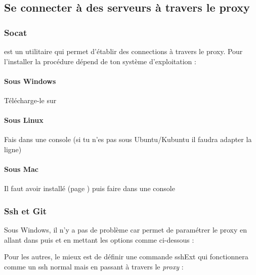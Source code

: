 \subsection{Se connecter à des serveurs à travers le proxy}

\subsubsection{Socat}

 est un utilitaire qui permet d'établir des connections à travers le proxy. Pour l'installer la procédure dépend de ton système d'exploitation :

\paragraph{Sous Windows} Télécharge-le sur 
\paragraph{Sous Linux} Fais  dans une console (si tu n'es pas sous Ubuntu/Kubuntu il faudra adapter la ligne)
\paragraph{Sous Mac} Il faut avoir installé  (page \pageref{mac-fink}) puis faire dans une console

\subsubsection{Ssh et Git}

Sous Windows, il n'y a pas de problème car  permet de paramétrer le proxy en allant dans  puis  et en mettant les options comme ci-dessous :


Pour les autres, le mieux est de définir une commande sshExt qui fonctionnera comme un ssh normal mais en passant à travers le \emph{proxy} :


